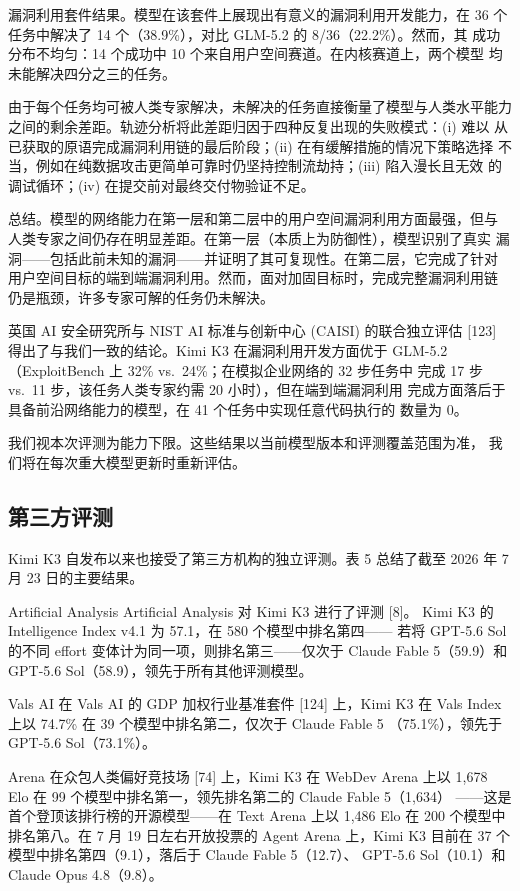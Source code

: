 \documentclass[
  10
]{article}
\begin{document}
漏洞利用套件结果。模型在该套件上展现出有意义的漏洞利用开发能力，在 36 个
任务中解决了 14 个（38.9\%），对比 GLM-5.2 的 8/36（22.2\%）。然而，其
成功分布不均匀：14 个成功中 10 个来自用户空间赛道。在内核赛道上，两个模型
均未能解决四分之三的任务。

由于每个任务均可被人类专家解决，未解决的任务直接衡量了模型与人类水平能力
之间的剩余差距。轨迹分析将此差距归因于四种反复出现的失败模式：(i) 难以
从已获取的原语完成漏洞利用链的最后阶段；(ii) 在有缓解措施的情况下策略选择
不当，例如在纯数据攻击更简单可靠时仍坚持控制流劫持；(iii) 陷入漫长且无效
的调试循环；(iv) 在提交前对最终交付物验证不足。

总结。模型的网络能力在第一层和第二层中的用户空间漏洞利用方面最强，但与
人类专家之间仍存在明显差距。在第一层（本质上为防御性），模型识别了真实
漏洞——包括此前未知的漏洞——并证明了其可复现性。在第二层，它完成了针对
用户空间目标的端到端漏洞利用。然而，面对加固目标时，完成完整漏洞利用链
仍是瓶颈，许多专家可解的任务仍未解決。

英国 AI 安全研究所与 NIST AI 标准与创新中心 (CAISI) 的联合独立评估
{[}123{]} 得出了与我们一致的结论。Kimi K3 在漏洞利用开发方面优于
GLM-5.2（ExploitBench 上 32\% vs.~24\%；在模拟企业网络的 32 步任务中
完成 17 步 vs.~11 步，该任务人类专家约需 20 小时），但在端到端漏洞利用
完成方面落后于具备前沿网络能力的模型，在 41 个任务中实现任意代码执行的
数量为 0。

我们视本次评测为能力下限。这些结果以当前模型版本和评测覆盖范围为准，
我们将在每次重大模型更新时重新评估。

\subsection{第三方评测}\label{third-party-evaluation}

Kimi K3 自发布以来也接受了第三方机构的独立评测。表 5 总结了截至 2026 年
7 月 23 日的主要结果。

Artificial Analysis Artificial Analysis 对 Kimi K3 进行了评测 {[}8{]}。
Kimi K3 的 Intelligence Index v4.1 为 57.1，在 580 个模型中排名第四——
若将 GPT-5.6 Sol 的不同 effort 变体计为同一项，则排名第三——仅次于 Claude
Fable 5（59.9）和 GPT-5.6 Sol（58.9），领先于所有其他评测模型。

Vals AI 在 Vals AI 的 GDP 加权行业基准套件 {[}124{]} 上，Kimi K3 在
Vals Index 上以 74.7\% 在 39 个模型中排名第二，仅次于 Claude Fable 5
（75.1\%），领先于 GPT-5.6 Sol（73.1\%）。

Arena 在众包人类偏好竞技场 {[}74{]} 上，Kimi K3 在 WebDev Arena 上以
1,678 Elo 在 99 个模型中排名第一，领先排名第二的 Claude Fable 5（1,634）
——这是首个登顶该排行榜的开源模型——在 Text Arena 上以 1,486 Elo 在 200
个模型中排名第八。在 7 月 19 日左右开放投票的 Agent Arena 上，Kimi K3
目前在 37 个模型中排名第四（9.1），落后于 Claude Fable 5（12.7）、
GPT-5.6 Sol（10.1）和 Claude Opus 4.8（9.8）。
\end{document}
